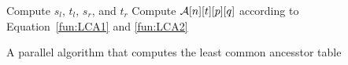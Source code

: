 \begin{algorithm}[!thb]
\SetAlgoNoLine
{}

 {
   {
     {
      Compute $s_l$, $t_l$, $s_r$, and $t_r$ \;
       {
        Compute ${\cal A}[n][t][p][q]$ according to Equation~\ref{fun:LCA1} and \ref{fun:LCA2} \;
      }
    }
  }
}

\caption{A parallel algorithm that computes the least common ancesstor table}
\label{alg:parallel-LCA}
\end{algorithm}
